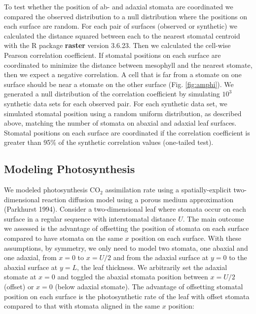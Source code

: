 \documentclass[12pt,halfline,a4paper,]{ouparticle}
\begin{document}
To test whether the position of ab- and adaxial stomata are coordinated
we compared the observed distribution to a null distribution where the
positions on each surface are random. For each pair of surfaces
(observed or synthetic) we calculated the distance squared between each
to the nearest stomatal centroid with the R package \textbf{raster}
version 3.6.23. Then we calculated the cell-wise Pearson correlation
coefficient. If stomatal positions on each surface are coordinated to
minimize the distance between mesophyll and the nearest stomate, then we
expect a negative correlation. A cell that is far from a stomate on one
surface should be near a stomate on the other surface (Fig.
\ref{fig:amphi}). We generated a null distribution of the correlation
coefficient by simulating \(10^3\) synthetic data sets for each observed
pair. For each synthetic data set, we simulated stomatal position using
a random uniform distribution, as described above, matching the number
of stomata on abaxial and adaxial leaf surfaces. Stomatal positions on
each surface are coordinated if the correlation coefficient is greater
than 95\% of the synthetic correlation values (one-tailed test).

\hypertarget{modeling-photosynthesis}{%
\subsection{Modeling Photosynthesis}\label{modeling-photosynthesis}}

We modeled photosynthesis CO\(_2\) assimilation rate using a
spatially-explicit two-dimensional reaction diffusion model using a
porous medium approximation (Parkhurst 1994). Consider a two-dimensional
leaf where stomata occur on each surface in a regular sequence with
interstomatal distance \(U\). The main outcome we assessed is the
advantage of offsetting the position of stomata on each surface compared
to have stomata on the same \(x\) position on each surface. With these
assumptions, by symmetry, we only need to model two stomata, one abaxial
and one adaxial, from \(x = 0\) to \(x = U/2\) and from the adaxial
surface at \(y = 0\) to the abaxial surface at \(y = L\), the leaf
thickness. We arbitrarily set the adaxial stomate at \(x = 0\) and
toggled the abaxial stomata position between \(x = U/2\) (offset) or
\(x = 0\) (below adaxial stomate). The advantage of offsetting stomatal
position on each surface is the photosynthetic rate of the leaf with
offset stomata compared to that with stomata aligned in the same \(x\)
position:
\end{document}
